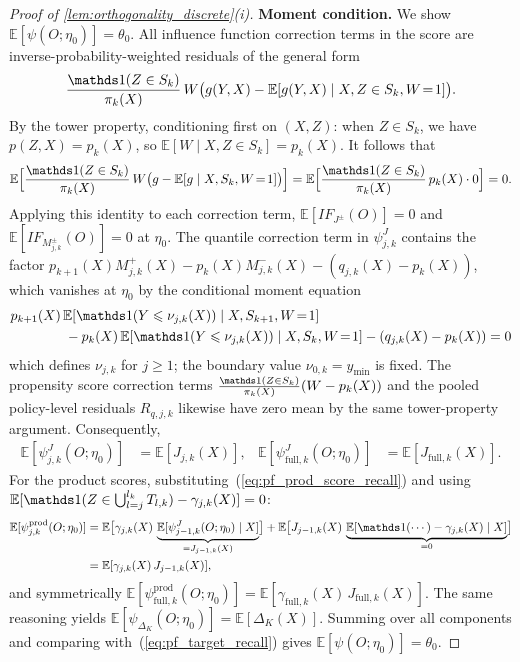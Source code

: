 \begin{proof}[Proof of \cref{lem:orthogonality_discrete}\textup{(i)}]
\medskip
\noindent\textbf{Moment condition.}
We show $\mathbb{E}[\psi(O;\eta_0)] = \theta_0$. All influence function correction terms in the score are inverse-probability-weighted residuals of the general form
\[
    \frac{\indicator(Z \in S_k)}{\pi_k(X)}\,W\bigl(g(Y,X) - \mathbb{E}[g(Y,X) \mid X, Z \in S_k, W\!=\!1]\bigr).
\]
By the tower property, conditioning first on $(X,Z)$: when $Z \in S_k$, we have $p(Z,X) = p_k(X)$, so $\mathbb{E}[W \mid X, Z \in S_k] = p_k(X)$. It follows that
\[
    \mathbb{E}\Big[\frac{\indicator(Z \in S_k)}{\pi_k(X)}\,W\bigl(g - \mathbb{E}[g \mid X, S_k, W\!=\!1]\bigr)\Big] = \mathbb{E}\Big[\frac{\indicator(Z \in S_k)}{\pi_k(X)}\,p_k(X)\cdot 0\Big] = 0.
\]
Applying this identity to each correction term, $\mathbb{E}[IF_{J^\pm}(O)] = 0$ and $\mathbb{E}[IF_{M_{j,k}^\pm}(O)] = 0$ at $\eta_0$. The quantile correction term in $\psi_{j,k}^J$ contains the factor $p_{k+1}(X)M_{j,k}^+(X) - p_k(X)M_{j,k}^-(X) - (q_{j,k}(X) - p_k(X))$, which vanishes at $\eta_0$ by the conditional moment equation
\begin{equation}\label{eq:pf_quantile_moment_dml}
    \begin{split}
        &p_{k+1}(X)\,\mathbb{E}[\indicator(Y \leqslant \nu_{j,k}(X)) \mid X, S_{k+1}, W\!=\!1]\\
        & \quad\quad \quad \quad - p_k(X)\,\mathbb{E}[\indicator(Y \leqslant \nu_{j,k}(X)) \mid X, S_k, W\!=\!1] - (q_{j,k}(X) - p_k(X)) = 0
    \end{split}
\end{equation}
which defines $\nu_{j,k}$ for $j\geqslant1$; the boundary value $\nu_{0,k}=y_{\min}$ is fixed. The propensity score correction terms $\frac{\indicator(Z \in S_k)}{\pi_k(X)}(W - p_k(X))$ and the pooled policy-level residuals $R_{q,j,k}$ likewise have zero mean by the same tower-property argument. Consequently,
\begin{align*}
    \mathbb{E}[\psi_{j,k}^J(O;\eta_0)] &= \mathbb{E}[J_{j,k}(X)], & \mathbb{E}[\psi_{\mathrm{full},k}^J(O;\eta_0)] &= \mathbb{E}[J_{\mathrm{full},k}(X)].
\end{align*}
For the product scores, substituting~(\ref{eq:pf_prod_score_recall}) and using $\mathbb{E}[\indicator(Z \in \bigcup_{l=j}^{l_k} T_{l,k}) - \gamma_{j,k}(X)] = 0$:
\begin{align*}
    \mathbb{E}[\psi_{j,k}^{\mathrm{prod}}(O;\eta_0)] &= \mathbb{E}\bigl[\gamma_{j,k}(X)\,\underbrace{\mathbb{E}[\psi_{j-1,k}^J(O;\eta_0) \mid X]}_{= J_{j-1,k}(X)}\bigr] + \mathbb{E}\bigl[J_{j-1,k}(X)\,\underbrace{\mathbb{E}[\indicator(\cdots) - \gamma_{j,k}(X) \mid X]}_{= 0}\bigr] \\
    &= \mathbb{E}[\gamma_{j,k}(X)\,J_{j-1,k}(X)],
\end{align*}
and symmetrically $\mathbb{E}[\psi_{\mathrm{full},k}^{\mathrm{prod}}(O;\eta_0)] = \mathbb{E}[\gamma_{\mathrm{full},k}(X)\,J_{\mathrm{full},k}(X)]$. The same reasoning yields $\mathbb{E}[\psi_{\Delta_K}(O;\eta_0)] = \mathbb{E}[\Delta_K(X)]$. Summing over all components and comparing with~(\ref{eq:pf_target_recall}) gives $\mathbb{E}[\psi(O;\eta_0)] = \theta_0$.


\end{proof}

